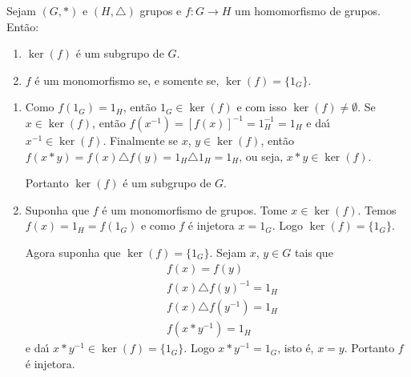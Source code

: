 \begin{proposicao}
	Sejam $(G, *)$ e $(H, \triangle)$ grupos e $f : G \to H$ um homomorfismo de grupos. Ent\~ao:
	\begin{enumerate}[label={\roman*})]
		\item $\ker(f)$ \'e um subgrupo de $G$.
		\item $f$ \'e um monomorfismo se, e somente se, $\ker(f) = \{1_G\}$.
	\end{enumerate}
\end{proposicao}
\begin{prova}
	\begin{enumerate}[label={\roman*})]
		\item Como $f(1_G) = 1_H$, ent\~ao $1_G \in \ker(f)$ e com isso $\ker(f) \ne \emptyset$. Se $x \in \ker(f)$, ent\~ao $f(x^{-1}) = [f(x)]^{-1} = 1_H^{-1} = 1_H$ e da{\'\i} $x^{-1} \in \ker(f)$. Finalmente se $x$, $y \in \ker(f)$, ent\~ao $f(x*y) = f(x)\triangle f(y) = 1_H \triangle 1_H = 1_H$, ou seja, $x * y \in \ker(f)$.

		Portanto $\ker(f)$ \'e um subgrupo de $G$.

		\item Suponha que $f$ \'e um monomorfismo de grupos. Tome $x \in \ker(f)$. Temos $f(x) = 1_H = f(1_G)$ e como $f$ \'e injetora $x = 1_G$. Logo $\ker(f) = \{1_G\}$.

		Agora suponha que $\ker(f) = \{1_G\}$. Sejam $x$, $y \in G$ tais que
		\begin{align*}
			&f(x) = f(y)\\
			&f(x)\triangle f(y)^{-1} = 1_H\\
			&f(x)\triangle f(y^{-1}) = 1_H\\
			&f(x * y^{-1}) = 1_H
		\end{align*}
		e da{\'\i} $x*y^{-1} \in \ker(f) = \{1_G\}$. Logo $x*y^{-1} = 1_G$, isto \'e, $x = y$. Portanto $f$ \'e injetora.
	\end{enumerate}
\end{prova}







